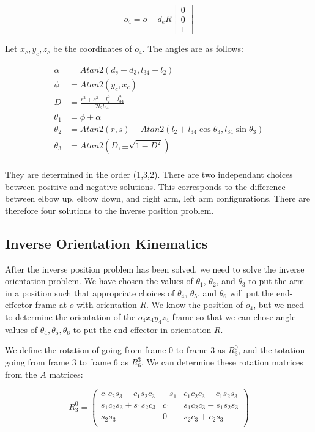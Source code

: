 \documentclass{article}
\begin{document}
\[ o_4 = o - d_e R \left[ \begin{matrix} 0\\0\\1\end{matrix} \right] \]

Let $x_c,y_c,z_c$ be the coordinates of $o_4$.
The angles are as follows:

\begin{align*}
\alpha & = Atan2(d_s + d_3, l_{34} + l_2)\\
\phi & = Atan2(y_c, x_c)\\
D & = \frac{r^2 + s^2 - l_2^2 - l_{34}^2}{2 l_2 l_{34}} \\
\theta_1 & = \phi \pm \alpha\\
\theta_2 & = Atan2(r, s) - Atan2(l_2 + l_{34} \cos \theta_3, l_{34} \sin \theta_3) \\
\theta_3 & = Atan2(D, \pm \sqrt{1 - D^2}) \\
\end{align*}

They are determined in the order (1,3,2).
There are two independant choices between positive and negative solutions.
This corresponds to the difference between elbow up, elbow down, 
	and right arm, left arm configurations.
There are therefore four solutions to the inverse position problem.

\subsection{Inverse Orientation Kinematics}

After the inverse position problem has been solved, we need to solve the
	inverse orientation problem.
We have chosen the values of $\theta_1$, $\theta_2$, and $\theta_3$
	to put the arm in a position such that appropriate choices of $\theta_4$,
	$\theta_5$, and $\theta_6$ will put the end-effector frame at $o$ with
	orientation $R$.
We know the position of $o_4$, but we need to determine the orientation
	of the $o_4 x_4 y_4 z_4$ frame so that we can chose angle values
	of $\theta_4, \theta_5, \theta_6$ to put the end-effector in orientation $R$.

We define the rotation of going from frame 0 to frame 3 as $R^0_3$, and the
	totation going from frame 3 to frame 6 as $R^3_6$.
We can determine these rotation matrices from the $A$ matrices:

\[ R^0_3 =
	\left( \begin{matrix}
		c_1 c_2 s_3 + c_1 s_2 c_3 & - s_1 & c_1 c_2 c_3 - c_1 s_2 s_3 \\
		s_1 c_2 s_3 + s_1 s_2 c_3 & c_1 & s_1 c_2 c_3 - s_1 s_2 s_3 \\
		s_2 s_3 & 0 & s_2 c_3 + c_2 s_3 \\
	\end{matrix} \right) \]
\end{document}
